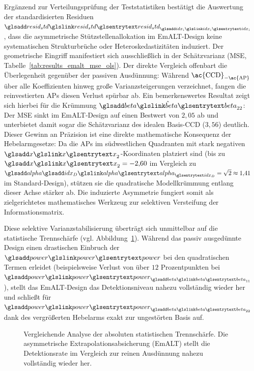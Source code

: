 Ergänzend zur Verteilungsprüfung der Teststatistiken bestätigt die Auswertung der standardisierten Residuen $\sym{resid_std}_{\sym{idx_i}}$, dass die asymmetrische Stützstellenallokation im \ac{EmALT}-Design keine systematischen Strukturbrüche oder Heteroskedastizitäten induziert.
Der geometrische Eingriff manifestiert sich ausschließlich in der Schätzvarianz (\ac{MSE}, Tabelle~\ref{tab:results_emalt_mse_ols}).
Der direkte Vergleich offenbart die Überlegenheit gegenüber der passiven Ausdünnung: Während $\textnormal{\ac{CCD}}_{-\textnormal{\ac{AP}}}$ über alle Koeffizienten hinweg große Varianzsteigerungen verzeichnet, fangen die reinvestierten \acp{AP} diesen Verlust spürbar ab.
Ein bemerkenswertes Resultat zeigt sich hierbei für die Krümmung $\hat{\sym{beta}}_{22}$: Der \ac{MSE} sinkt im \ac{EmALT}-Design auf einen Bestwert von $2{,}05$ ab und unterbietet damit sogar die Schätzvarianz des idealen Basis-\ac{CCD} ($3{,}56$) deutlich.
Dieser Gewinn an Präzision ist eine direkte mathematische Konsequenz der Hebelarmgesetze: Da die \acp{AP} im südwestlichen Quadranten mit stark negativen $\sym{x}_2$-Koordinaten platziert sind (bis zu $\sym{x}_2 = -2{,}60$ im Vergleich zu $\symsub{alpha}{idx_D} = \sqrt{2} \approx 1{,}41$ im Standard-Design), stützen sie die quadratische Modellkrümmung entlang dieser Achse stärker ab.
Die induzierte Asymmetrie fungiert somit als zielgerichtetes mathematisches Werkzeug zur selektiven Versteifung der Informationsmatrix.



Diese selektive Varianzstabilisierung überträgt sich unmittelbar auf die statistische Trennschärfe (vgl. Abbildung~\ref{fig:ma_abb5.4.2_powerdev_ols}).
Während das passiv ausgedünnte Design einen drastischen Einbruch der $\sym{power}$ bei den quadratischen Termen erleidet (beispielsweise Verlust von über $12$ Prozentpunkten bei $\sym{power}_{\sym{beta}_{11}}$), stellt das \ac{EmALT}-Design das Detektionsniveau nahezu vollständig wieder her und schließt für $\sym{power}_{\sym{beta}_{22}}$ dank des vergrößerten Hebelarms exakt zur ungestörten Basis auf.

\begin{figure}[htbp]
    \centering
    \setlength{}
    \setlength\figureheight{5cm}
    
    \caption{Vergleichende Analyse der absoluten statistischen Trennschärfe. Die asymmetrische Extrapolationsabsicherung (\ac{EmALT}) stellt die Detektionsrate im Vergleich zur reinen Ausdünnung nahezu vollständig wieder her.}
    \label{fig:ma_abb5.4.2_powerdev_ols}
\end{figure}


